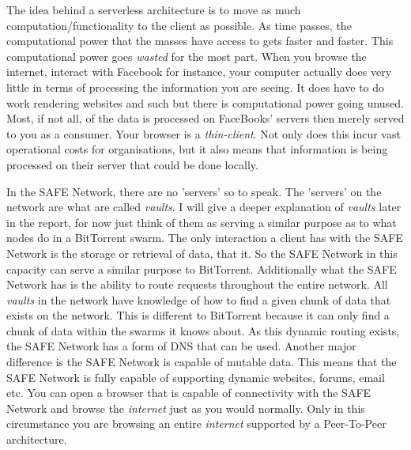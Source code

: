 \documentclass{l4proj}
\begin{document}
The idea behind a serverless architecture is to move as much computation/functionality to the client as possible. As time passes, the computational power that the masses have access to gets faster and faster. This computational power goes \textit{wasted} for the most part. When you browse the internet, interact with Facebook for instance, your computer actually does very little in terms of processing the information you are seeing. It does have to do work rendering websites and such but there is computational power going unused. Most, if not all, of the data is processed on FaceBooks' servers then merely served to you as a consumer. Your browser is a \textit{thin-client}. Not only does this incur vast operational costs for organisations, but it also means that information is being processed on their server that could be done locally.

In the SAFE Network, there are no 'servers' so to speak. The 'servers' on the network are what are called \textit{vaults}. I will give a deeper explanation of \textit{vaults} later in the report, for now just think of them as serving a similar purpose as to what nodes do in a BitTorrent swarm.  The only interaction a client has with the SAFE Network is the storage or retrieval of data, that it. So the SAFE Network in this capacity can serve a similar purpose to BitTorrent. Additionally what the SAFE Network has is the ability to route requests throughout the entire network. All \textit{vaults} in the network have knowledge of how to find a given chunk of data that exists on the network. This is different to BitTorrent because it can only find a chunk of data within the swarms it knows about. As this dynamic routing exists, the SAFE Network has a form of DNS that can be used. Another major difference is the SAFE Network is capable of mutable data. This means that the SAFE Network is fully capable of supporting dynamic websites, forums, email etc. You can open a browser that is capable of connectivity with the SAFE Network and browse the \textit{internet} just as you would normally. Only in this circumstance you are browsing an entire \textit{internet} supported by a Peer-To-Peer architecture.
\end{document}

